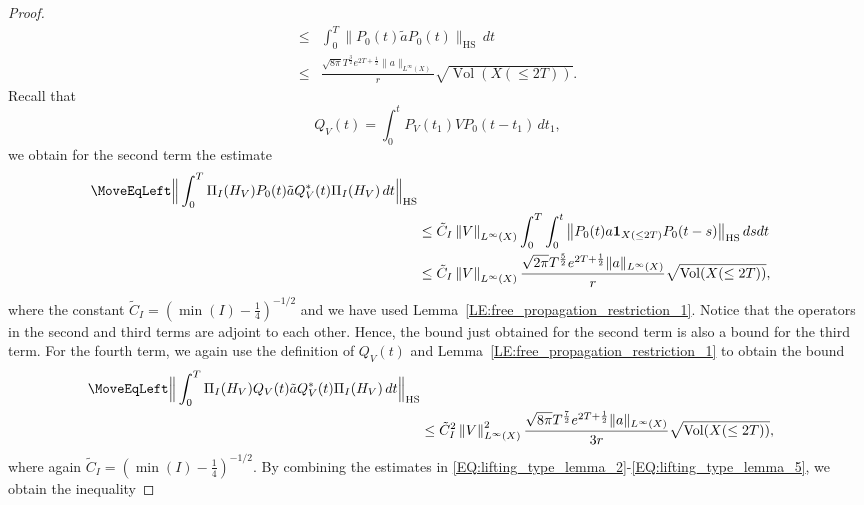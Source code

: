 \documentclass[11pt,twoside,reqno]{amsart}
\newcommand{\1}{\mathrm{\mathbf{1}}}
\newcommand{\bHS}{\mathrm{HS}}
\DeclareMathOperator{\Vol}{Vol}
\newcommand{\norm}[1]{\left\lVert#1\right\rVert}
\numberwithin{equation}{section}
\theoremstyle{plain}
\theoremstyle{definition}
\theoremstyle{remark}
\begin{document}
\begin{proof}
\begin{equation}
\begin{aligned}
        \leq{}&  \int_0^T \big\lVert P_0(t) \tilde{a} P_0(t) \big\rVert_{\bHS} \, d t 
        \\
        \leq{}& \frac{ \sqrt{8\pi} T^{\frac{3}{2}} e^{2T+\frac{1}{2}} \lVert a \rVert_{L^\infty(X)}}{r} \sqrt{\Vol(X(\leq2T))}.
    \end{aligned} 
    \end{equation}
Recall that
    \begin{equation*}
    Q_V(t) =  \int_{0}^{t}  P_V(t_1) V  P_0(t-t_1) \, dt_1,
    \end{equation*}
    we obtain for the second term the estimate
    \begin{equation}\label{EQ:lifting_type_lemma_4}
    \begin{aligned}
        \MoveEqLeft  \Big\lVert \int_0^T \Pi_I(H_V) P_0(t)  \tilde{a}  Q_V^{*}(t)\Pi_I(H_V) \,  d t  \Big\rVert_{\bHS}
         \\
         &\leq \tilde{C}_I \norm{V}_{L^\infty(X)} \int_0^T \int_0^t  \big\lVert P_0(t) a \boldsymbol{1}_{X(\leq2T)}  P_0(t-s) \big\rVert_{\bHS} \,  d s  d t 
        \\
        &\leq \tilde{C}_I \norm{V}_{L^\infty(X)}  \frac{ \sqrt{2\pi} T^{\frac{5}{2}} e^{2T+\frac12} \lVert a \rVert_{L^\infty(X)}}{r} \sqrt{\Vol(X(\leq2T))},
    \end{aligned} 
    \end{equation}
    where the constant $\tilde{C}_I = (\min(I)-\frac14)^{-1/2}$ and we have used Lemma~\ref{LE:free_propagation_restriction_1}. Notice that the operators in the second and third terms are adjoint to each other. Hence, the bound just obtained for the second term is also a bound for the third term. For the fourth term, we again use the definition of $Q_V(t)$ and Lemma~\ref{LE:free_propagation_restriction_1} to obtain the bound   
    \begin{equation}\label{EQ:lifting_type_lemma_5}
    \begin{aligned}
        \MoveEqLeft \Big\lVert \int_0^T \Pi_I(H_V)Q_V(t) \tilde{a} Q_V^{*}(t)\Pi_I(H_V) \,  d t  \Big\rVert_{\bHS} 
        \\
        &\leq \tilde{C}_I^2 \norm{V}_{L^\infty(X)}^2 \frac{ \sqrt{8\pi} T^{\frac{7}{2}} e^{2T+\frac12} \lVert a \rVert_{L^\infty(X)}}{3r} \sqrt{\Vol(X(\leq2T))},
    \end{aligned} 
    \end{equation}
    where again $\tilde{C}_I = (\min(I)-\frac14)^{-1/2}$. By combining the estimates in \eqref{EQ:lifting_type_lemma_2}-\eqref{EQ:lifting_type_lemma_5}, we obtain the inequality  

\end{proof}
\end{document}
